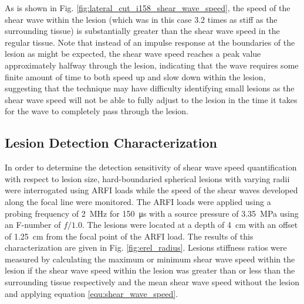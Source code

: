 			As is shown in Fig. \ref{fig:lateral_cut_i158_shear_wave_speed}, the speed of the shear wave within the lesion (which was in this case 3.2 times as stiff as the surrounding tissue) is substantially greater than the shear wave speed in the regular tissue. Note that instead of an impulse response at the boundaries of the lesion as might be expected, the shear wave speed reaches a peak value approximately halfway through the lesion, indicating that the wave requires some finite amount of time to both speed up and slow down within the lesion, suggesting that the technique may have difficulty identifying small lesions as the shear wave speed will not be able to fully adjust to the lesion in the time it takes for the wave to completely pass through the lesion.

		\FloatBarrier
		\subsection{Lesion Detection Characterization}
			In order to determine the detection sensitivity of shear wave speed quantification with respect to lesion size, hard-boundaried spherical lesions with varying radii were interrogated using ARFI loads while the speed of the shear waves developed along the focal line were monitored. The ARFI loads were applied using a probing frequency of \SI{2}{\MHz} for \SI{150}{\us} with a source pressure of \SI{3.35}{\MPa} using an F-number of $f/1.0$. The lesions were located at a depth of \SI{4}{\cm} with an offset of \SI{1.25}{\cm} from the focal point of the ARFI load. The results of this characterization are given in Fig. \ref{fig:erel_radius}. Lesions stiffness ratios were measured by calculating the maximum or minimum shear wave speed within the lesion if the shear wave speed within the lesion was greater than or less than the surrounding tissue respectively and the mean shear wave speed without the lesion and applying equation \ref{equ:shear_wave_speed}.

